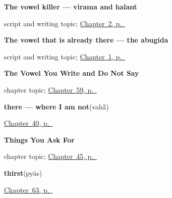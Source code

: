 \noindent\begin{minipage}[t]{\linewidth}
\raggedright
\textbf{The vowel killer — virama and halant}\par
\footnotesize script and writing topic; \hyperref[ch:introductions]{Chapter~2, p.~\pageref*{ch:introductions}}
\end{minipage}\par\smallskip

\noindent\begin{minipage}[t]{\linewidth}
\raggedright
\textbf{The vowel that is already there — the abugida}\par
\footnotesize script and writing topic; \hyperref[ch:greetings]{Chapter~1, p.~\pageref*{ch:greetings}}
\end{minipage}\par\smallskip

\noindent\begin{minipage}[t]{\linewidth}
\raggedright
\textbf{The Vowel You Write and Do Not Say}\par
\footnotesize chapter topic; \hyperref[ch:hi-script-second-wave]{Chapter~59, p.~\pageref*{ch:hi-script-second-wave}}
\end{minipage}\par\smallskip

\noindent\begin{minipage}[t]{\linewidth}
\raggedright
\textbf{there — where I am not}\enspace\emph{}\enspace(vahā̃)\par
\footnotesize \hyperref[ch:hi-pointing-and-asking]{Chapter~40, p.~\pageref*{ch:hi-pointing-and-asking}}
\end{minipage}\par\smallskip

\noindent\begin{minipage}[t]{\linewidth}
\raggedright
\textbf{Things You Ask For}\par
\footnotesize chapter topic; \hyperref[ch:hi-ask-for]{Chapter~45, p.~\pageref*{ch:hi-ask-for}}
\end{minipage}\par\smallskip

\noindent\begin{minipage}[t]{\linewidth}
\raggedright
\textbf{thirst}\enspace\emph{}\enspace(pyās)\par
\footnotesize \hyperref[ch:hi-what-the-body-tells-you]{Chapter~63, p.~\pageref*{ch:hi-what-the-body-tells-you}}
\end{minipage}\par\smallskip

